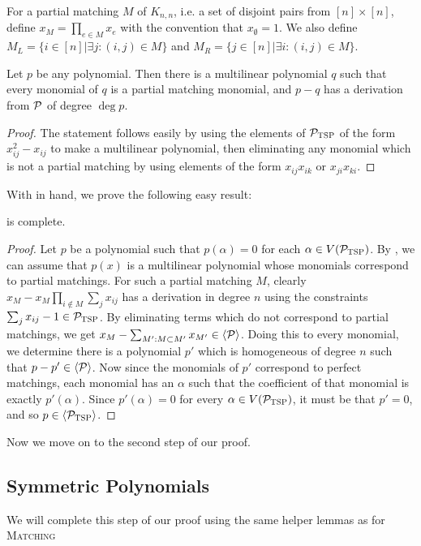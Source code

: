 For a partial matching $M$ of $K_{n,n}$, i.e. a set of disjoint pairs from $[n] \times [n]$, define $x_M = \prod_{e \in M} x_e$ with the convention that $x_{\emptyset} = 1$. We also define $M_L = \{i \in [n] | \exists j: (i,j) \in M\}$ and $M_R = \{j \in [n] | \exists i: (i,j) \in M\}$. 
\begin{lemma}\label{lem:tsp-monomials}
 Let $p$ be any polynomial. Then there is a multilinear polynomial $q$ such that every monomial of $q$ is a partial matching monomial, and $p-q$ has a derivation from $\mathcal P$ of degree $\deg p$.
\end{lemma}
\begin{proof}
The statement follows easily by using the elements of $\mathcal P_{\textsc{TSP}}$ of the form $x_{ij}^2 - x_{ij}$ to make a multilinear polynomial, then eliminating any monomial which is not a partial matching by using elements of the form $x_{ij}x_{ik}$ or $x_{ji}x_{ki}$. 
\end{proof}
With  in hand, we prove the following easy result:
\begin{lemma}\label{lem:tsp-complete}
\gen{\ptsp} is complete.  
\end{lemma}
\begin{proof}
Let $p$ be a polynomial such that $p(\alpha) = 0$ for each $\alpha \in V(\mathcal P_{\textsc{TSP}})$. By , we can assume that $p(x)$ is a multilinear polynomial whose monomials correspond to partial matchings. For such a partial matching $M$, clearly $x_M - x_M\prod_{i \notin M} \sum_j x_{ij}$ has a derivation in degree $n$ using the constraints $\sum_j x_{ij} - 1 \in \mathcal P_{\textsc{TSP}}$. By eliminating terms which do not correspond to partial matchings, we get $x_M - \sum_{M': M \subset M'} x_{M'} \in \langle \mathcal P \rangle$. Doing this to every monomial, we determine there is a polynomial $p'$ which is homogeneous of degree $n$ such that $p - p' \in \langle \mathcal P \rangle$. Now since the monomials of $p'$ correspond to perfect matchings, each monomial has an $\alpha$ such that the coefficient of that monomial is exactly $p'(\alpha)$. Since $p'(\alpha) = 0$ for every $\alpha \in V(\mathcal P_{\textsc{TSP}})$, it must be that $p' = 0$, and so $p \in \langle \mathcal P_{\textsc{TSP}} \rangle$.
\end{proof}
Now we move on to the second step of our proof. 

\subsection{Symmetric Polynomials}

We will complete this step of our proof using the same helper lemmas as for \textsc{Matching}

